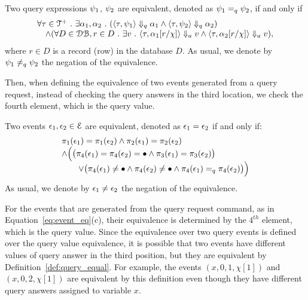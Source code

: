 \begin{defn}
%
\label{def:query_equal}
Two query expressions $\psi_1$, $\psi_2$ are equivalent, denoted as $\psi_1 =_{q} \psi_2$, if and only if
\[
 \begin{array}{l} 
 \forall \mathtt{\tau} \in \mathcal{T}^{+} ~.~ \exists \alpha_1, \alpha_2 
 ~.~
 (\langle \mathtt{\tau}, \psi_1 \rangle \Downarrow_q \alpha_1 \land \langle \mathtt{\tau}, \psi_2  \rangle \Downarrow_q \alpha_2) 
 \\
 \quad \land (\forall D \in \mathcal{DB}, r \in D ~.~ 
 \exists v 
 ~.~ 
 \langle \mathtt{\tau}, \alpha_1[r/\chi] \rangle \Downarrow_a v \land \langle \mathtt{\tau}, \alpha_2[r/\chi]  \rangle \Downarrow_a v), 
 \end{array}
 \]
where $r \in D$ is a record (row) in the database $D$. 
As usual, we denote by $\psi_1 \neq_{q} \psi_2$ the negation of the equivalence.
\end{defn}
%
Then, when defining the equivalence of two events generated from a query request,
instead of checking the query answers in the third location,
we check the fourth element, which is the query value.
\begin{defn}
 \label{def:event_eq}
 Two events $\mathtt{\epsilon}_1, \mathtt{\epsilon}_2 \in \mathcal{E}$ are equivalent, 
 denoted as $\mathtt{\epsilon}_1 = \mathtt{\epsilon}_2$ 
 if and only if:
 \begin{equation}
 \label{eq:event_eq}
 \begin{array}{l}
 \pi_1(\mathtt{\epsilon}_1) = \pi_1(\mathtt{\epsilon}_2) 
 \land 
 \pi_2(\mathtt{\epsilon}_1) = \pi_2(\mathtt{\epsilon}_2) 
\\
 \land 
 \Big( 
 \big(\pi_{4}(\mathtt{\epsilon}_1) = \pi_{4}(\mathtt{\epsilon}_2) = \bullet \land
 \pi_{3}(\mathtt{\epsilon}_1) = \pi_{3}(\mathtt{\epsilon}_2) \big)
 \\ \qquad 
 \lor \big(
 \pi_{4}(\mathtt{\epsilon}_1) \neq \bullet \land \pi_{4}(\mathtt{\epsilon}_2) \neq \bullet
 \land
 \pi_{4}(\mathtt{\epsilon}_1) =_q \pi_{4}(\mathtt{\epsilon}_2)\big)
 \Big)
 \end{array}
 \end{equation}
 As usual, we denote by $\mathtt{\epsilon}_1 \neq \mathtt{\epsilon}_2$ the negation of the equivalence.
\end{defn}
For the events that are generated from the query request command, as in Equation~\ref{eq:event_eq}(c),
their equivalence is determined by the $4^{th}$ element, which is the query value.
Since the equivalence over two query events is defined over the query value equivalence, 
it is possible that two events have different values of query answer in the third position, but they
are equivalent by Definition~\ref{def:query_equal}.
For example, the events $(x, 0, 1, \chi[1])$ and $(x, 0, 2, \chi[1])$ are equivalent by this definition even though they have different query answers assigned to variable $x$.

